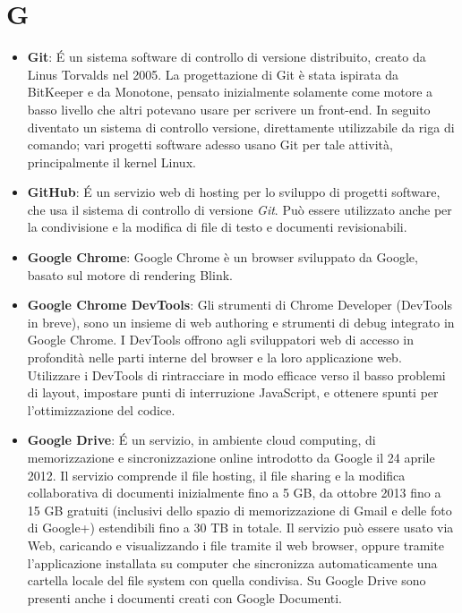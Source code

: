 \section{G}
\begin{itemize}
	\item
	\textbf{Git}: É un sistema software di controllo di versione distribuito, creato da Linus Torvalds nel 2005.
	La progettazione di Git è stata ispirata da BitKeeper e da Monotone, pensato 	inizialmente solamente come motore a basso livello che altri potevano usare per scrivere un front-end. In seguito diventato un sistema di controllo versione, direttamente utilizzabile da riga di comando; vari progetti software adesso usano Git per tale attività, principalmente il kernel Linux.
	\item
	\textbf{GitHub}: É un servizio web di hosting per lo sviluppo di progetti software, che usa il sistema di controllo di versione \textit{Git}. Può essere utilizzato anche per la condivisione e la modifica di file di testo e documenti revisionabili. 
	\item
	\textbf{Google Chrome}: Google Chrome è un browser sviluppato da Google, basato sul motore di rendering Blink.
	\item
	\textbf{Google Chrome DevTools}: Gli strumenti di Chrome Developer (DevTools in breve), sono un insieme di web authoring e strumenti di debug integrato in Google Chrome. I DevTools offrono agli sviluppatori web di accesso in profondità nelle parti interne del browser e la loro applicazione web. Utilizzare i DevTools di rintracciare in modo efficace verso il basso problemi di layout, impostare punti di interruzione JavaScript, e ottenere spunti per l'ottimizzazione del codice.
	\item
	\textbf{Google Drive}: É un servizio, in ambiente cloud computing, di memorizzazione e sincronizzazione online introdotto da Google il 24 aprile 2012. Il servizio comprende il file hosting, il file sharing e la modifica collaborativa di documenti inizialmente fino a 5 GB, da ottobre 2013 fino a 15 GB gratuiti (inclusivi dello spazio di memorizzazione di Gmail e delle foto di Google+) estendibili fino a 30 TB in totale. Il servizio può essere usato via Web, caricando e visualizzando i file tramite il web browser, oppure tramite l'applicazione installata su computer che sincronizza automaticamente una cartella locale del file system con quella condivisa. Su Google Drive sono presenti anche i documenti creati con Google Documenti.
\end{itemize}
